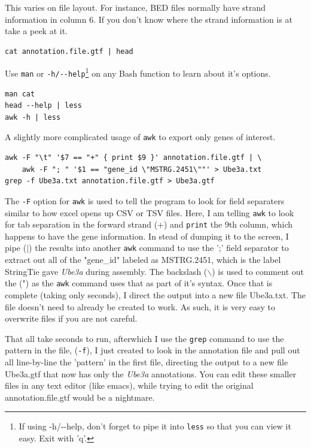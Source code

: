 This varies on file layout. For instance, BED files normally have strand information in column 6. If you don't know where the strand information is at take a peek at it.
\begin{verbatim}
cat annotation.file.gtf | head
\end{verbatim}

Use \texttt{man} or \texttt{-h/-{}-help}\footnote{If using -h/-{}-help, don't forget to pipe it into \texttt{less} so that you can view it easy. Exit with 'q'.} on any Bash function to learn about it's options.
\begin{verbatim}
man cat
head --help | less
awk -h | less
\end{verbatim}

A slightly more complicated usage of \texttt{awk} to export only genes of interest.
\begin{verbatim}
awk -F "\t" '$7 == "+" { print $9 }' annotation.file.gtf | \
    awk -F "; " '$1 == "gene_id \"MSTRG.2451\""' > Ube3a.txt
grep -f Ube3a.txt annotation.file.gtf > Ube3a.gtf
\end{verbatim}

The \texttt{-F} option for \texttt{awk} is used to tell the program to look for field separaters similar to how excel opens up CSV or TSV files. Here, I am telling \texttt{awk} to look for tab separation in the forward strand (+) and \texttt{print} the 9th column, which happens to have the gene information. In stead of dumping it to the screen, I pipe ($|$) the results into another \texttt{awk} command to use the ';' field separator to extract out all of the "gene\_id" labeled as MSTRG.2451, which is the label StringTie gave \textit{Ube3a} during assembly. The backslash ($\backslash$) is used to comment out the (") as the \texttt{awk} command uses that as part of it's syntax. Once that is complete (taking only seconds), I direct the output into a new file Ube3a.txt. The file doesn't need to already be created to work. As such, it is very easy to overwrite files if you are not careful. 

That all take seconds to run, afterwhich I use the \texttt{grep} command to use the pattern in the file, (\texttt{-f}), I just created to look in the annotation file and pull out all line-by-line the 'pattern' in the first file, directing the output to a new file Ube3a.gtf that now has only the \textit{Ube3a} annotations. You can edit these smaller files in any text editor (like emacs), while trying to edit the original annotation.file.gtf would be a nightmare. 

